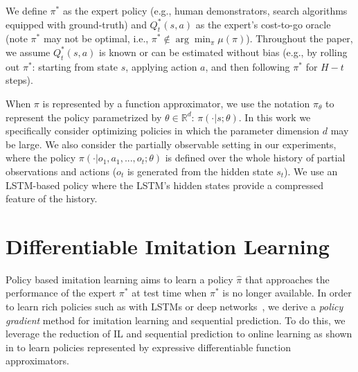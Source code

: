 \documentclass{article}
\begin{document}
We define $\pi^{*}$ as the expert policy (e.g., human demonstrators, search algorithms equipped with ground-truth) and $Q^*_t(s,a)$ as the expert's cost-to-go oracle (note $\pi^*$ may not be optimal, i.e., $\pi^* \not\in \arg\min_{\pi} \mu(\pi)$). Throughout the paper, we assume $Q_t^{*}(s,a)$ is known or can be estimated without bias (e.g., by rolling out $\pi^*$: starting from state $s$, applying action $a$, and then following $\pi^*$ for $H-t$ steps). %

When $\pi$ is represented by a function approximator, we use the notation $\pi_{\theta}$ to represent the policy parametrized by $\theta\in \mathbb{R}^{d}$: $\pi(\cdot|s;\theta)$. In this work we specifically consider optimizing policies in which the parameter dimension $d$ may be large.  We also consider the partially observable setting in our experiments, where the policy $\pi(\cdot|o_1,a_1,...,o_t;\theta)$ is defined over the whole history of partial observations and actions ($o_t$ is generated from the hidden state $s_t$). We use an LSTM-based policy \cite{duan2016benchmarking} where the LSTM's hidden states provide a compressed feature of the history.



\section{Differentiable Imitation Learning}
\label{sec:alg}
Policy based imitation learning aims to learn a policy $\hat \pi$ that approaches the performance of the expert $\pi^*$ at test time when $\pi^*$ is no longer available. In order to learn rich policies such as with LSTMs or deep networks~\cite{schulman2015trust}, we derive a \emph{policy gradient} method for imitation learning and sequential prediction. To do this, we leverage the reduction of IL and sequential prediction to online learning as shown in \citep{ross2014reinforcement} to learn policies represented by expressive differentiable function approximators. 
\end{document}
